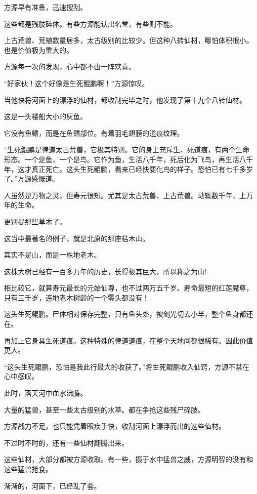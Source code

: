 \begin{this_body}
方源早有准备，迅速搜刮。

这些都是残肢碎体。有些方源能认出名堂，有些则不能。

上古荒兽、荒植数量居多，太古级别的比较少。但这种八转仙材，哪怕体积很小。也是价值极为重大的。

方源每一次的发现，心中都不由一阵欢喜。

“好家伙！这个好像是生死鲲鹏啊！”方源惊叹。

当他快将河面上的漂浮的仙材，都收刮完毕之时，他发现了第十九个八转仙材。

这是一头楼船大小的灰鱼。

它没有鱼鳍，而是在鱼鳍部位。有着羽毛翅膀的道痕纹理。

“生死鲲鹏是律道太古荒兽，它极其特别。它的身上充斥生、死道痕，有两个生命形态。一个是鱼，一个是鸟。它作为鱼，生活八千年，死后化为飞鸟，再生活八千年，这才真正死亡。这头生死鲲鹏，看来已经快要化鸟的样子。恐怕已有七千多岁了。”方源感慨道。

人虽然是万物之灵，但寿元很短。尤其是太古荒兽、上古荒兽。动辄数千年，上万年的生命。

更别提那些草木了。

这当中最著名的例子，就是北原的那座枯木山。

其实不是山，而是一株地老木。

这株大树已经有一百多万年的历史，长得极其巨大，所以称之为山!

相比较它，就算寿元最长的元始仙尊，也不过两万五千岁。寿命最短的红莲魔尊，只有三千岁，连地老木树龄的一个零头都没有！

这头生死鲲鹏。尸体相对保存完整，只有鱼头处，被剑光切去小半，整个鱼身都还在。

再加上它身具生死道痕。这种特殊的律道道痕，在整个天地间都很稀有。因此价值更大。

“这头生死鲲鹏，恐怕是我此行最大的收获了。”将生死鲲鹏收入仙窍，方源不禁在心中感叹。

此时，落天河中血水沸腾。

大量的猛兽，甚至一些太古级别的水草。都在争抢这些残尸碎肢。

方源战力不足，也只能凭着眼疾手快，收刮河面上漂浮而出的这些仙材。

不过时不时的，还有一些仙材翻腾出来。

这些仙材，大部分都被方源收取。有一些，摄于水中猛兽之威，方源明智的没有和这些猛兽抢食。

渐渐的，河面下，已经乱了套。


\end{this_body}

